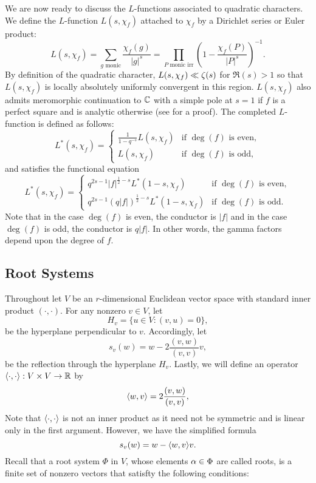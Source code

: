 \documentclass[12pt,reqno,oneside]{amsart}
\begin{document}
        We are now ready to discuss the $L$-functions associated to quadratic characters. We define the $L$-function $L(s,\chi_{f})$ attached to $\chi_{f}$ by a Dirichlet series or Euler product:
        \[
            L(s,\chi_{f}) = \sum_{\text{$g$ monic}}\frac{\chi_{f}(g)}{|g|^{s}} = \prod_{\text{$P$ monic irr}}\left(1-\frac{\chi_{f}(P)}{|P|^{s}}\right)^{-1}.
        \]
        By definition of the quadratic character, $L(s,\chi_{f}) \ll \zeta(s)$ for $\Re(s) > 1$ so that $L(s,\chi_{f})$ is locally absolutely uniformly convergent in this region. $L(s,\chi_{f})$ also admits meromorphic continuation to $\mathbb{C}$ with a simple pole at $s = 1$ if $f$ is a perfect square and is analytic otherwise (see \cite{R} for a proof). The completed $L$-function is defined as follows:
        \[
            L^{\ast}(s,\chi_{f}) = \begin{cases} \frac{1}{1-q^{-s}}L(s,\chi_{f}) & \text{if $\deg(f)$ is even}, \\ L(s,\chi_{f}) & \text{if $\deg(f)$ is odd}, \end{cases}
        \]
        and satisfies the functional equation
        \[
            L^{\ast}(s,\chi_{f}) = \begin{cases} q^{2s-1}|f|^{\frac{1}{2}-s}L^{\ast}(1-s,\chi_{f}) & \text{if $\deg(f)$ is even}, \\ q^{2s-1}(q|f|)^{\frac{1}{2}-s}L^{\ast}(1-s,\chi_{f}) & \text{if $\deg(f)$ is odd}. \end{cases}
        \]
        Note that in the case $\deg(f)$ is even, the conductor is $|f|$ and in the case $\deg(f)$ is odd, the conductor is $q|f|$. In other words, the gamma factors depend upon the degree of $f$.
    \subsection*{Root Systems}
        Throughout let $V$ be an $r$-dimensional Euclidean vector space with standard inner product $(\cdot,\cdot)$. For any nonzero $v \in V$, let
        \[
            H_{v} = \{u \in V:(v,u) = 0\},
        \]
        be the hyperplane perpendicular to $v$. Accordingly, let
        \[
            s_{v}(w) = w-2\frac{(v,w)}{(v,v)}v, 
        \]
        be the reflection through the hyperplane $H_{v}$. Lastly, we will define an operator $\langle\cdot,\cdot\rangle:V \times V \to \mathbb{R}$ by
        \[
            \langle w,v\rangle = 2\frac{(v,w)}{(v,v)},
        \]
        Note that $\langle\cdot,\cdot\rangle$ is not an inner product as it need not be symmetric and is linear only in the first argument. However, we have the simplified formula
        \[
            s_{v}(w) = w-\langle w,v\rangle v.
        \]
        Recall that a root system $\Phi$ in $V$, whose elements $\alpha \in \Phi$ are called roots, is a finite set of nonzero vectors that satisfty the following conditions:
\end{document}
